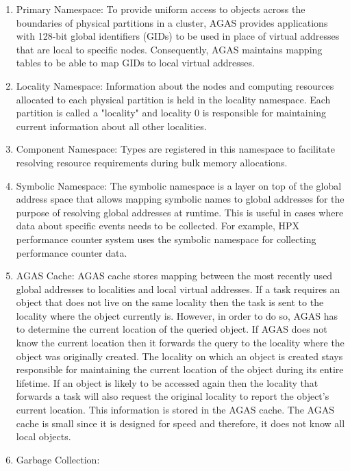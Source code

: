 \begin{enumerate}
    \item{Primary Namespace:
        To provide uniform access to objects across the boundaries
        of physical partitions in a cluster, AGAS provides applications
        with 128-bit global identifiers (GIDs) to be used in place of
        virtual addresses that are local to specific nodes.
        Consequently, AGAS maintains mapping tables to be able to map GIDs
        to local virtual addresses.}
    \item{Locality Namespace:
        Information about the nodes and computing resources allocated to
        each physical partition is held in the locality namespace. Each 
        partition is called a "locality" and locality 0 is responsible for 
        maintaining current information about all other localities.}
    \item{Component Namespace:
        Types are registered in this namespace to facilitate resolving resource 
        requirements during bulk memory allocations.}
    \item{Symbolic Namespace:
		The symbolic namespace is a layer on top of the global address space
		that allows mapping symbolic names to global addresses for the purpose
		of resolving global addresses at runtime. This is useful in cases where
		data about specific events needs to be collected. For example, HPX
		performance counter system uses the symbolic namespace for collecting
		performance counter data.}
    \item{AGAS Cache:
		AGAS cache stores mapping between the most recently used global
		addresses to localities and local virtual addresses. If a task requires
		an object that does not live on the same locality then the task is sent
		to the locality where the object currently is. However, in order to do
		so, AGAS has to determine the current location of the queried object.
		If AGAS does not know the current location then it forwards the query
		to the locality where the object was originally created. The locality
		on which an object is created stays responsible for maintaining the
		current location of the object during its entire lifetime. If an object
		is likely to be accessed again then the locality that forwards a task
		will also request the original locality to report the object's current
		location. This information is stored in the AGAS cache. The AGAS cache
		is small since it is designed for speed and therefore, it does not know
		all local objects.}
    \item{Garbage Collection:
}
\end{enumerate}
